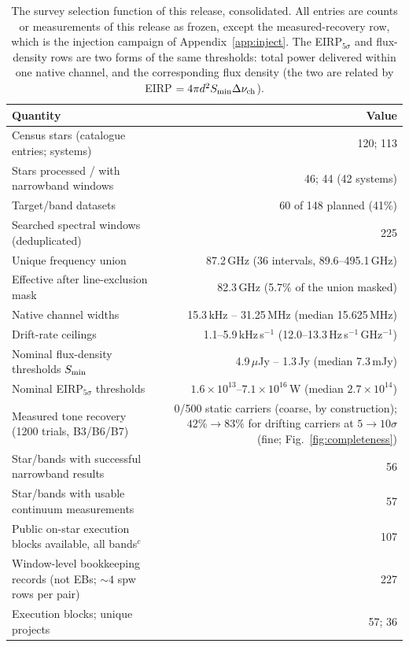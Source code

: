 \documentclass{openjournal}
\begin{document}
\begin{table}
\centering
\small
\setlength{\tabcolsep}{4pt}
\caption{The survey selection function of this release, consolidated.
All entries are counts or measurements of this release as frozen,
except the measured-recovery row, which is the injection campaign of
Appendix~\ref{app:inject}. The
EIRP$_{5\sigma}$ and flux-density rows are two forms of the same
thresholds: total power delivered within one native channel, and the
corresponding flux density (the two are related by
EIRP $= 4\pi d^{2} S_{\rm min} \Delta\nu_{\rm ch}$).}
\label{tab:searchspace}
\begin{tabular}{@{}l r@{}}
\hline
Quantity & Value \\
\hline
Census stars (catalogue entries; systems) & 120; 113 \\
Stars processed / with narrowband windows & 46; 44 (42 systems) \\
Target/band datasets & 60 of 148 planned (41\%) \\
Searched spectral windows (deduplicated) & 225 \\
Unique frequency union & 87.2\,GHz (36 intervals, 89.6--495.1\,GHz) \\
Effective after line-exclusion mask & 82.3\,GHz (5.7\% of the union masked) \\
Native channel widths & 15.3\,kHz -- 31.25\,MHz (median 15.625\,MHz) \\
Drift-rate ceilings & 1.1--5.9\,kHz\,s$^{-1}$ (12.0--13.3\,Hz\,s$^{-1}$\,GHz$^{-1}$) \\
Nominal flux-density thresholds $S_{\rm min}$ & 4.9\,$\mu$Jy -- 1.3\,Jy (median 7.3\,mJy) \\
Nominal EIRP$_{5\sigma}$ thresholds & $1.6\times10^{13}$--$7.1\times10^{16}$\,W (median $2.7\times10^{14}$) \\
Measured tone recovery (1200 trials, B3/B6/B7) & 0/500 static carriers (coarse, by construction); $42\%\rightarrow83\%$ for drifting carriers at $5\rightarrow10\sigma$ (fine; Fig.~\ref{fig:completeness}) \\
Star/bands with successful narrowband results & 56 \\
Star/bands with usable continuum measurements & 57 \\
Public on-star execution blocks available, all bands$^{c}$ & 107 \\
Window-level bookkeeping records (not EBs; ${\sim}4$ spw rows per pair) & 227 \\
Execution blocks; unique projects & 57; 36 \\

\end{tabular}
\end{table}
\end{document}
